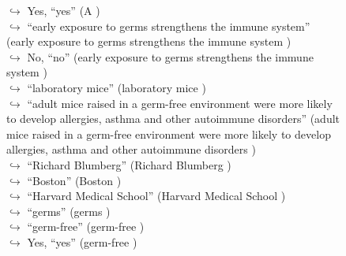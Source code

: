\documentclass[11pt,a4paper, onecolumn]{article}
\begin{document}
\begin{figure}[t] \small \begin{tcolorbox}[boxsep=0pt,left=5pt,right=0pt,top=2pt,colback = yellow!5] \begin{dialogue}
 \small 
\colorbox{pink!25}{$\hookrightarrow$}
\colorbox{red!25}{Yes,}
{ ``yes'' (A ) }
\\
\colorbox{pink!25}{$\hookrightarrow$}
{ ``early exposure to germs strengthens the immune system'' (early exposure to germs strengthens the immune system ) }
\\
\colorbox{pink!25}{$\hookrightarrow$}
\colorbox{red!25}{No,}
{ ``no'' (early exposure to germs strengthens the immune system ) }
\\
\colorbox{pink!25}{$\hookrightarrow$}
{ ``laboratory mice'' (laboratory mice ) }
\\
\colorbox{pink!25}{$\hookrightarrow$}
{ ``adult mice raised in a germ-free environment were more likely to develop allergies, asthma and other autoimmune disorders'' (adult mice raised in a germ-free environment were more likely to develop allergies, asthma and other autoimmune disorders ) }
\\
\colorbox{pink!25}{$\hookrightarrow$}
{ ``Richard Blumberg'' (Richard Blumberg ) }
\\
\colorbox{pink!25}{$\hookrightarrow$}
{ ``Boston'' (Boston ) }
\\
\colorbox{pink!25}{$\hookrightarrow$}
{ ``Harvard Medical School'' (Harvard Medical School ) }
\\
\colorbox{pink!25}{$\hookrightarrow$}
{ ``germs'' (germs ) }
\\
\colorbox{pink!25}{$\hookrightarrow$}
{ ``germ-free'' (germ-free ) }
\\
\colorbox{pink!25}{$\hookrightarrow$}
\colorbox{red!25}{Yes,}
{ ``yes'' (germ-free ) }
\\

\end{dialogue}
\end{tcolorbox}
\end{figure}
\end{document}
